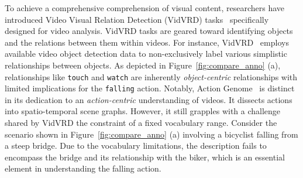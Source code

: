 \documentclass[letterpaper]{article}
\begin{document}
%
To achieve a comprehensive comprehension of visual content, researchers have introduced Video Visual Relation Detection (VidVRD) tasks~\cite{Shang2017VideoVR,shang2019annotating} specifically designed for video analysis. VidVRD tasks are geared toward identifying objects and the relations between them within videos.
% 
For instance, VidVRD~\cite{Shang2017VideoVR} employs available video object detection data to non-exclusively label various simplistic relationships between objects. As depicted in Figure~\ref{fig:compare_anno} (a), relationships like \texttt{touch} and \texttt{watch} are inherently \emph{object-centric} relationships with limited implications for the \texttt{falling} action.
Notably, Action Genome~\cite{genome} is distinct in its dedication to an \emph{action-centric} understanding of videos. It dissects actions into spatio-temporal scene graphs. However, it still grapples with a challenge shared by VidVRD  the constraint of a fixed vocabulary range. Consider the scenario shown in Figure~\ref{fig:compare_anno} (a) involving a bicyclist falling from a steep bridge. Due to the vocabulary limitations, the description fails to encompass the bridge and its relationship with the biker, which is an essential element in understanding the falling action.
\end{document}
